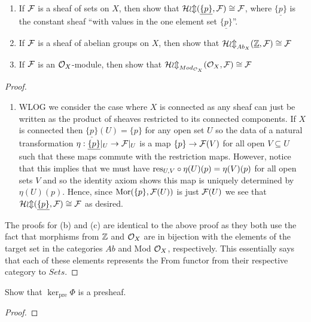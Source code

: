 \begin{exercise} \mbox{}
    \begin{enumerate}[label = (\alph*)]
        \item If $\mathcal{F}$ is a sheaf of sets on $X$, then show that $\mathcal{Hom}(\underline{\{p\}}, \mathcal{F}) \cong \mathcal{F}$, where $\underline{\{p\}}$ is the constant sheaf ``with values in the one element set $\underline{\{p\}}$''. 
        \item If $\mathcal{F}$ is a sheaf of abelian groups on $X$, then show that $\mathcal{Hom}_{Ab_X}(\underline{\mathbb{Z}}, \mathcal{F}) \cong \mathcal{F}$
        \item If $\mathcal{F}$ is an $\mathcal{O}_X$-module, then show that $\mathcal{Hom}_{Mod_{\mathcal{O}_X}}(\mathcal{O}_X, \mathcal{F}) \cong \mathcal{F}$ 
    \end{enumerate}
\end{exercise}

\begin{proof} \mbox{}
    \begin{enumerate}[label = (\alph*)]
        \item WLOG we consider the case where $X$ is connected as any sheaf can just be written as the product of sheaves restricted to its connected components. If $X$ is connected then $\underline{\{p\}}(U) = \{p\}$ for any open set $U$ so the data of a natural transformation $\eta: \underline{\{p\}}|_U \to \mathcal{F}|_U$ is a map $\{p\} \to \mathcal{F}(V)$ for all open $V \subseteq U$ such that these maps commute with the restriction maps. However, notice that this implies that we must have $\text{res}_{U, V} \circ \eta(U)(p) = \eta(V)(p)$ for all open sets $V$ and so the identity axiom shows this map is uniquely determined by $\eta(U)(p)$. Hence, since $\text{Mor}(\{p\}, \mathcal{F}(U))$ is just $\mathcal{F}(U)$ we see that $\mathcal{Hom}(\underline{\{p\}}, \mathcal{F}) \cong \mathcal{F}$ as desired. 
    \end{enumerate}
    The proofs for (b) and (c) are identical to the above proof as they both use the fact that morphisms from $\mathbb{Z}$ and $\mathcal{O}_X$ are in bijection with the elements of the target set in the categories $Ab$ and Mod $\mathcal{O}_X$, respectively. This essentially says that each of these elements represents the From functor from their respective category to $Sets$. 
\end{proof}

\begin{exercise}
    Show that $\ker_{\text{pre}}\Phi$ is a presheaf. 
\end{exercise}

\begin{proof}
    
\end{proof}

